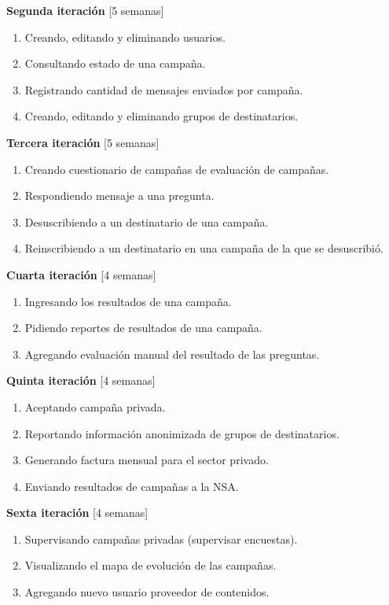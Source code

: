 \documentclass[a4paper, 10pt, twoside]{article}
\begin{document}
\textbf{Segunda iteración} [5 semanas]
\begin{enumerate}
\item Creando, editando y eliminando usuarios.
\item Consultando estado de una campaña.
\item Registrando cantidad de mensajes enviados por campaña.
\item Creando, editando y eliminando grupos de destinatarios.
\end{enumerate}

\textbf{Tercera iteración} [5 semanas]
\begin{enumerate}
\item Creando cuestionario de campañas de evaluación de campañas.
\item Respondiendo mensaje a una pregunta.
\item Desuscribiendo a un destinatario de una campaña.
\item Reinscribiendo a un destinatario en una campaña de la que se desuscribió.
\end{enumerate}

\textbf{Cuarta iteración} [4 semanas]
\begin{enumerate}
\item Ingresando los resultados de una campaña.
\item Pidiendo reportes de resultados de una campaña.
\item Agregando evaluación manual del resultado de las preguntas.
\end{enumerate}

\textbf{Quinta iteración} [4 semanas]
\begin{enumerate}
\item Aceptando campaña privada.
\item Reportando información anonimizada de grupos de destinatarios.
\item Generando factura mensual para el sector privado.
\item Enviando resultados de campañas a la NSA.
\end{enumerate}

\textbf{Sexta iteración} [4 semanas]
\begin{enumerate}
\item Supervisando campañas privadas (supervisar encuestas).
\item Visualizando el mapa de evolución de las campañas.
\item Agregando nuevo usuario proveedor de contenidos.
\end{enumerate}
\end{document}
